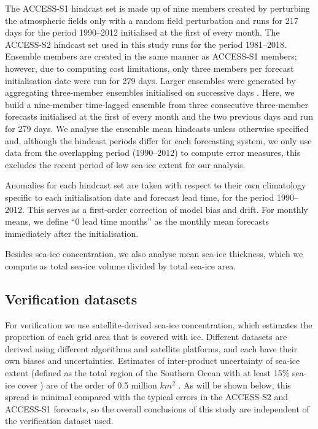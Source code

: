 \documentclass[tc, manuscript]{copernicus}
\begin{document}
The ACCESS-S1 hindcast set is made up of nine members created by
perturbing the atmospheric fields only with a random field perturbation
\citep{hudson2017} and runs for 217 days for the period 1990--2012
initialised at the first of every month. The ACCESS-S2 hindcast set used
in this study runs for the period 1981--2018. Ensemble members are
created in the same manner as ACCESS-S1 members; however, due to
computing cost limitations, only three members per forecast
initialisation date were run for 279 days. Larger ensembles were
generated by aggregating three-member ensembles initialised on
successive days \citep{wedd2022}. Here, we build a nine-member
time-lagged ensemble from three consecutive three-member forecasts
initialised at the first of every month and the two previous days and
run for 279 days. We analyse the ensemble mean hindcasts unless
otherwise specified and, although the hindcast periods differ for each
forecasting system, we only use data from the overlapping period
(1990--2012) to compute error measures, this excludes the recent period
of low sea-ice extent for our analysis.

Anomalies for each hindcast set are taken with respect to their own
climatology specific to each initialisation date and forecast lead time,
for the period 1990--2012. This serves as a first-order correction of
model bias and drift. For monthly means, we define ``0 lead time
months'' as the monthly mean forecasts immediately after the
initialisation.

Besides sea-ice concentration, we also analyse mean sea-ice thickness,
which we compute as total sea-ice volume divided by total sea-ice area.

\subsection{Verification datasets}\label{verification-datasets}

For verification we use satellite-derived sea-ice concentration, which
estimates the proportion of each grid area that is covered with ice.
Different datasets are derived using different algorithms and satellite
platforms, and each have their own biases and uncertainties. Estimates
of inter-product uncertainty of sea-ice extent (defined as the total
region of the Southern Ocean with at least 15\% sea-ice cover
\citep{cavalieri1991}) are of the order of 0.5 million \(km^2\)
\citep{meier2019}. As will be shown below, this spread is minimal
compared with the typical errors in the ACCESS-S2 and ACCESS-S1
forecasts, so the overall conclusions of this study are independent of
the verification dataset used.
\end{document}
